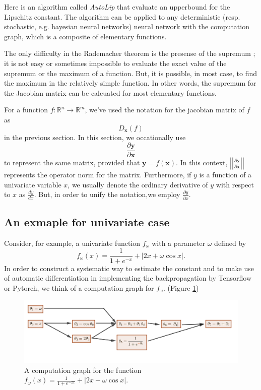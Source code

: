 \documentclass[12pt]{report}
\numberwithin{figure}{chapter}
\theoremstyle{plain}
\theoremstyle{definition}
\theoremstyle{corollary}
\theoremstyle{definition}
\theoremstyle{plain}
\theoremstyle{definition}
\theoremstyle{plain}
\begin{document}
Here is an algorithm called \emph{AutoLip} that evaluate an upperbound for the Lipschitz constant.
The algorithm can be applied to any deterministic (resp. stochastic, e.g. bayesian neural networks) neural network with the computation graph, which is a composite of elementary functions.

The only difficulty in the Rademacher theorem is the presense of the supremum ; it is not easy or sometimes impossible to evaluate the exact value of the supremum or the maximum of a function.
But, it is possible, in most case, to find the maximum in the relatively simple function.
In other words, the supremum for the Jacobian matrix can be calcuated for most elementary functions.

For a function \(f:\mathbb R^n\to\mathbb R^m\), we've used the notation for the jacobian matrix of \(f\) as
\[D_{\boldsymbol x}(f)\]
in the previous section.
In this section, we occationally use
\[\frac{\partial\boldsymbol y}{\partial\boldsymbol x}\]
to represent the same matrix, provided that \(\boldsymbol y=f(\boldsymbol x)\).
In this context, \(\left|\left|\frac{\partial\boldsymbol y}{\partial\boldsymbol x}\right|\right|\) represents the operator norm for the matrix.
Furthermore, if \(y\) is a function of a univariate variable \(x\), we usually denote the ordinary derivative of \(y\) with respect to \(x\) as \(\frac{dy}{dx}\).
But, in order to unify the notation,we employ \(\frac{\partial y}{\partial x}\).


\subsection{An exmaple for  univariate case}
Consider, for example, a univariate function \(f_\omega\) with a parameter \(\omega\) defined by
\[f_\omega(x) = \frac1{1+e^{-x}}+\left|2x+\omega\cos x\right|.\]
In order to construct a systematic way to estimate the constant and to make use of automatic differentiation in implementing the backpropagation by Tensorflow or Pytorch, we think of a computation graph for \(f_\omega\). (Figure \ref{computation_graph_1})

\begin{figure}[h]
\centering
\includegraphics[width=\textwidth]{computation_graph_1}
\caption{A computation graph for the function \(f_\omega(x)=\frac1{1+e^{-2x}}+\left|2x+\omega\cos x\right|.\)}
\label{computation_graph_1}
\end{figure}
\end{document}

